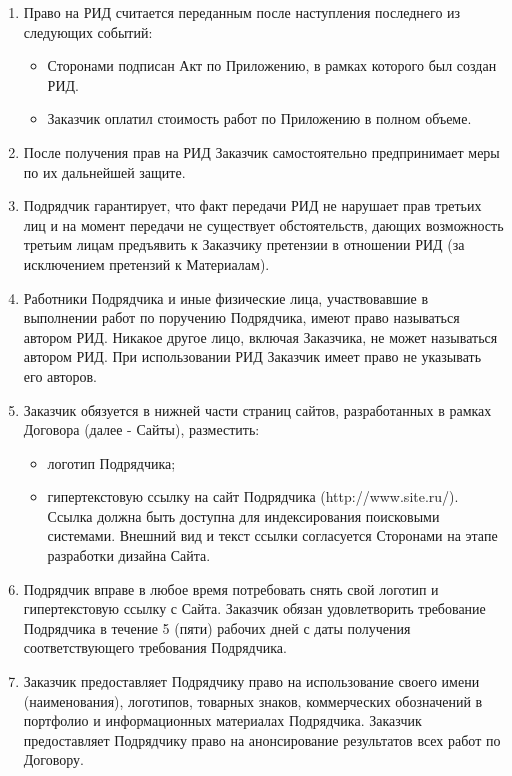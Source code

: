 \documentclass[14pt,a4paper]{article}
\begin{document}
\begin{enumerate}
\begin{enumerate}
		\item Право на РИД считается переданным после наступления последнего из следующих событий:
		\begin{itemize}
			\item Сторонами подписан Акт по Приложению, в рамках которого был создан РИД.
			\item Заказчик оплатил стоимость работ по Приложению в полном объеме.
		\end{itemize}

		\item После получения прав на РИД Заказчик самостоятельно предпринимает меры по их дальнейшей защите.
		
		\item Подрядчик гарантирует, что факт передачи РИД не нарушает прав третьих лиц и на момент передачи не существует обстоятельств, дающих возможность третьим лицам предъявить к Заказчику претензии в отношении РИД (за исключением претензий к Материалам).
		
		\item Работники Подрядчика и иные физические лица, участвовавшие в выполнении работ по поручению Подрядчика, имеют право называться автором РИД. Никакое другое лицо, включая Заказчика, не может называться автором РИД. При использовании РИД Заказчик имеет право не указывать его авторов.
		
		\item Заказчик обязуется в нижней части страниц сайтов, разработанных в рамках Договора (далее - Сайты), разместить:
		\begin{itemize}
			\item логотип Подрядчика;
			\item гипертекстовую ссылку на сайт Подрядчика (http://www.site.ru/). Ссылка должна быть доступна для индексирования поисковыми системами. Внешний вид и текст ссылки согласуется Сторонами на этапе разработки дизайна Сайта.
		\end{itemize}

		\item Подрядчик вправе в любое время потребовать снять свой логотип и гипертекстовую ссылку с Сайта. Заказчик обязан удовлетворить требование Подрядчика в течение 5 (пяти) рабочих дней с даты получения соответствующего требования Подрядчика.

		\item Заказчик предоставляет Подрядчику право на использование своего имени (наименования), логотипов, товарных знаков, коммерческих обозначений в портфолио и информационных материалах Подрядчика. Заказчик предоставляет Подрядчику право на анонсирование результатов всех работ по Договору.
	\end{enumerate}


\end{enumerate}
\end{document}
